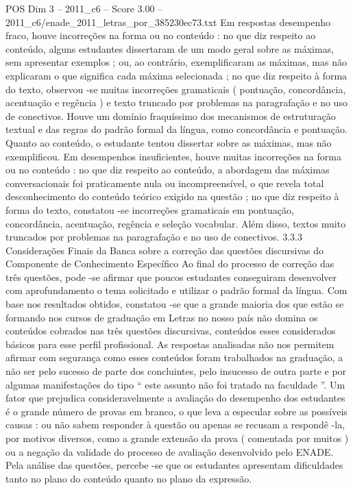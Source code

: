 \begin{textsample}{POS Dim 3 – 2011\_c6 – Score 3.00 – 2011\_c6/enade\_2011\_letras\_por\_385230ec73.txt}
Em respostas desempenho fraco, houve incorreções na forma ou no conteúdo : no que diz respeito ao conteúdo, alguns estudantes dissertaram de um modo geral sobre as máximas, sem apresentar exemplos ; ou, ao contrário, exemplificaram as máximas, mas não explicaram o que significa cada máxima selecionada ; no que diz respeito à forma do texto, observou -se muitas incorreções gramaticais ( pontuação, concordância, acentuação e regência ) e texto truncado por problemas na paragrafação e no uso de conectivos.
Houve um domínio fraquíssimo dos mecanismos de estruturação textual e das regras do padrão formal da língua, como concordância e pontuação.
Quanto ao conteúdo, o estudante tentou dissertar sobre as máximas, mas não exemplificou.
Em desempenhos insuficientes, houve muitas incorreções na forma ou no conteúdo : no que diz respeito ao conteúdo, a abordagem das máximas conversacionais foi praticamente nula ou incompreensível, o que revela total desconhecimento do conteúdo teórico exigido na questão ; no que diz respeito à forma do texto, constatou -se incorreções gramaticais em pontuação, concordância, acentuação, regência e seleção vocabular.
Além disso, textos muito truncados por problemas na paragrafação e no uso de conectivos. 3.3.3 Considerações Finais da Banca sobre a correção das questões discursivas do Componente de Conhecimento Específico Ao final do processo de correção das três questões, pode -se afirmar que poucos estudantes conseguiram desenvolver com aprofundamento o tema solicitado e utilizar o padrão formal da língua.
Com base nos resultados obtidos, constatou -se que a grande maioria dos que estão se formando nos cursos de graduação em Letras no nosso país não domina os conteúdos cobrados nas três questões discursivas, conteúdos esses considerados básicos para esse perfil profissional.
As respostas analisadas não nos permitem afirmar com segurança como esses conteúdos foram trabalhados na graduação, a não ser pelo sucesso de parte dos concluintes, pelo insucesso de outra parte e por algumas manifestações do tipo “ este assunto não foi tratado na faculdade ”.
Um fator que prejudica consideravelmente a avaliação do desempenho dos estudantes é o grande número de provas em branco, o que leva a especular sobre as possíveis causas : ou não sabem responder à questão ou apenas se recusam a respondê -la, por motivos diversos, como a grande extensão da prova ( comentada por muitos ) ou a negação da validade do processo de avaliação desenvolvido pelo ENADE.
Pela análise das questões, percebe -se que os estudantes apresentam dificuldades tanto no plano do conteúdo quanto no plano da expressão.

\end{textsample}
